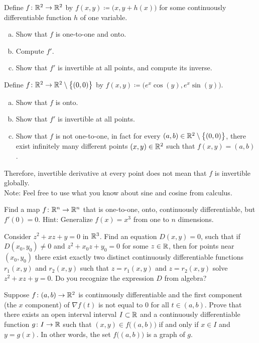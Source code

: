 \begin{exercise}
Define $f \colon {\mathbb{R}}^2 \to {\mathbb{R}}^2$ by $f(x,y) \coloneqq
\bigl(x,y+h(x)\bigr)$ for some continuously differentiable function $h$ of one
variable.
\begin{enumerate}[a)]
\item
Show that $f$ is one-to-one and onto.
\item
Compute $f'$.
\item
Show that $f'$ is invertible at all points, and compute
its inverse.
\end{enumerate}
\end{exercise}

\begin{exercise}
Define $f \colon {\mathbb{R}}^2 \to {\mathbb{R}}^2 \setminus \bigl\{ (0,0) \bigr\}$ by
$f(x,y) \coloneqq \bigl(e^x\cos(y),e^x\sin(y)\bigr)$.
\begin{enumerate}[a)]
\item
Show that $f$ is onto.
\item
Show that $f'$ is invertible at all points.
\item
Show that $f$ is not one-to-one, in fact for every $(a,b) \in {\mathbb{R}}^2
\setminus \bigl\{ (0,0) \bigr\}$,
there exist infinitely many different points $(x,y) \in {\mathbb{R}}^2$ such that 
$f(x,y) = (a,b)$.
\end{enumerate}
Therefore, invertible derivative at every point does not mean that
$f$ is invertible globally.\\
Note: Feel free to use what you know about sine and cosine from calculus.
\end{exercise}

\begin{exercise}
Find a map $f \colon {\mathbb{R}}^n \to {\mathbb{R}}^n$ that is one-to-one, onto,
continuously differentiable, but $f'(0) = 0$.  Hint: Generalize $f(x) = x^3$ from one
to $n$ dimensions.
\end{exercise}

\begin{exercise}
Consider $z^2 + xz + y =0$ in ${\mathbb{R}}^3$.  Find an equation $D(x,y)=0$, such that
if $D(x_0,y_0) \not= 0$ and $z^2+x_0z+y_0 = 0$ for some $z \in {\mathbb{R}}$,
then for points near $(x_0,y_0)$ there exist
exactly two distinct continuously differentiable functions $r_1(x,y)$
and $r_2(x,y)$ such that $z=r_1(x,y)$ and $z=r_2(x,y)$ solve
$z^2 + xz + y =0$.  Do you recognize the expression $D$ from algebra?
\end{exercise}


\begin{exercise}
Suppose $f \colon (a,b) \to {\mathbb{R}}^2$ is continuously differentiable and
the first component (the $x$ component) of $\nabla f(t)$ is not equal to 0
for all $t \in (a,b)$.
Prove that there exists an open interval interval $I \subset {\mathbb{R}}$ and
a continuously differentiable function $g \colon I \to {\mathbb{R}}$
such that 
$(x,y) \in f\bigl((a,b)\bigr)$ if and only if $x \in I$ and $y=g(x)$.
In other words, the set
$f\bigl((a,b)\bigr)$ is a graph of $g$.
\end{exercise}

